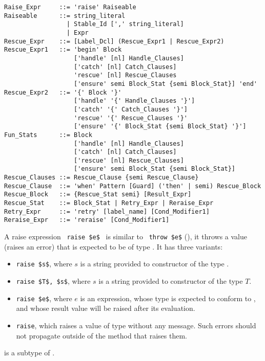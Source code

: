 \grammar\begin{lstlisting}
Raise_Expr     ::= 'raise' Raiseable
Raiseable      ::= string_literal
                 | Stable_Id [',' string_literal]
                 | Expr
Rescue_Expr    ::= [Label_Dcl] (Rescue_Expr1 | Rescue_Expr2)
Rescue_Expr1   ::= 'begin' Block 
                   ['handle' [nl] Handle_Clauses]
                   ['catch' [nl] Catch_Clauses]
                   'rescue' [nl] Rescue_Clauses
                   ['ensure' semi Block_Stat {semi Block_Stat}] 'end'
Rescue_Expr2   ::= '{' Block '}' 
                   ['handle' '{' Handle_Clauses '}']
                   ['catch' '{' Catch_Clauses '}']
                   'rescue' '{' Rescue_Clauses '}'
                   ['ensure' '{' Block_Stat {semi Block_Stat} '}']
Fun_Stats      ::= Block
                   ['handle' [nl] Handle_Clauses]
                   ['catch' [nl] Catch_Clauses]
                   ['rescue' [nl] Rescue_Clauses]
                   ['ensure' semi Block_Stat {semi Block_Stat}]
Rescue_Clauses ::= Rescue_Clause {semi Rescue_Clause}
Rescue_Clause  ::= 'when' Pattern [Guard] ('then' | semi) Rescue_Block
Rescue_Block   ::= {Rescue_Stat semi} [Result_Expr]
Rescue_Stat    ::= Block_Stat | Retry_Expr | Reraise_Expr
Retry_Expr     ::= 'retry' [label_name] [Cond_Modifier1]
Reraise_Expr   ::= 'reraise' [Cond_Modifier1]
\end{lstlisting}

A raise expression ~\lstinline!raise $e$!~ is similar to ~\lstinline!throw $e$! (), it throws a value (raises an error) that is expected to be of type . It has three variants: 
\begin{itemize}
\item[] \lstinline!raise $s$!, where $s$ is a string provided to constructor of the type . 
\item[] \lstinline!raise $T$, $s$!, where $s$ is a string provided to constructor of the type $T$. 
\item[] \lstinline!raise $e$!, where $e$ is an expression, whose type is expected to conform to , and whose result value will be raised after its evaluation. 
\item[] \lstinline!raise!, which raises a value of type  without any message. Such errors should not propagate outside of the method that raises them. 
\end{itemize}

 is a subtype of . 

